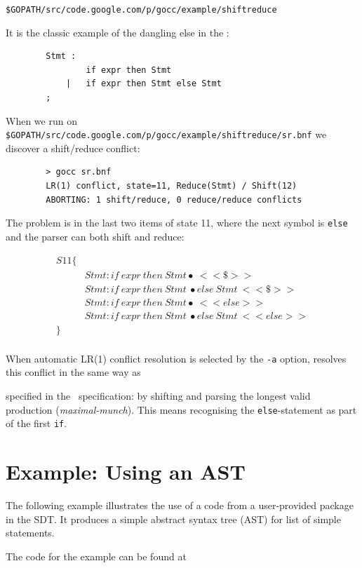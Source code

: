 \documentclass[12pt]{article}
\begin{document}
	\verb|$GOPATH/src/code.google.com/p/gocc/example/shiftreduce|

	It is the classic example of the dangling else in the \Clang:

	\begin{verbatim}
		Stmt :
		        if expr then Stmt
		    |   if expr then Stmt else Stmt
		;
	\end{verbatim}

	When we run \gocc on \verb|$GOPATH/src/code.google.com/p/gocc/example/shiftreduce/sr.bnf| we discover a shift/reduce conflict:

	\begin{verbatim}
		> gocc sr.bnf
		LR(1) conflict, state=11, Reduce(Stmt) / Shift(12)
		ABORTING: 1 shift/reduce, 0 reduce/reduce conflicts
	\end{verbatim}

	The problem is in the last two items of state 11, where the next symbol is \verb|else| and the parser can both shift and reduce:

	\[
		\begin{array}{ll}
			S11 \{ \\
			  & Stmt : if\ expr\ then\ Stmt\bullet\ <<\$>> \\
			  & Stmt : if\ expr\ then\ Stmt\ \bullet else\ Stmt\ <<\$>> \\
			  & Stmt : if\ expr\ then\ Stmt \bullet\ <<else>> \\
			  & Stmt : if\ expr\ then\ Stmt\ \bullet else\ Stmt\ <<else>> \\
			\} \\
		\end{array}
	\]

	When automatic LR(1) conflict resolution is selected by the \verb|-a| option, \gocc resolves this conflict in the same way as 
	\

	specified in the \Clang\ specification: by shifting and parsing the longest valid production ({\em maximal-munch}). This means recognising the \verb|else|-statement as part of the first \verb|if|.

\section{Example: Using an AST} \label{sec:example ast}
	The following example illustrates the use of a code from a user-provided package in the SDT. It produces a simple abstract syntax tree (AST) for list of simple statements. 

	The code for the example can be found at
\end{document}

